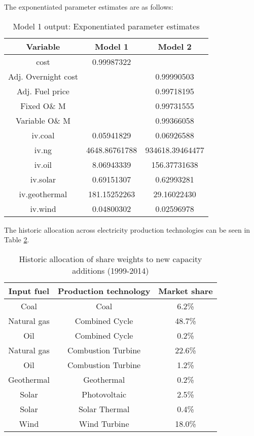\documentclass[10pt]{amsart}
\begin{document}
The exponentiated parameter estimates are as follows:
\begin{table}[H]
\caption{Model 1 output: Exponentiated parameter estimates}
\centering
\begin{tabular}{c c c}
\hline
\hline
Variable & Model 1 & Model 2 \\ [0.5ex]
\hline
cost & 0.99987322 & \\
Adj. Overnight cost & & 0.99990503 \\
Adj. Fuel price & & 0.99718195\\
Fixed O\& M & & 0.99731555\\
Variable O\& M & & 0.99366058\\
iv.coal & 0.05941829 & 0.06926588\\
iv.ng & 4648.86761788 & 934618.39464477\\
iv.oil & 8.06943339 & 156.37731638 \\
iv.solar & 0.69151307 & 0.62993281\\
iv.geothermal & 181.15252263 & 29.16022430\\
iv.wind & 0.04800302 & 0.02596978\\ [1ex]
\hline
\end{tabular}
\label{table:nl.1}
\end{table}

The historic allocation across electricity production technologies can be seen in Table \ref{table:perc}.

\begin{table}[H]
\caption{Historic allocation of share weights to new capacity additions (1999-2014)}
\centering
\begin{tabular}{c c c}
\hline
\hline
Input fuel & Production technology & Market share \\ [0.5ex]
\hline
Coal & Coal & 6.2\% \\
Natural gas & Combined Cycle & 48.7\% \\
Oil & Combined Cycle & 0.2\% \\
Natural gas & Combustion Turbine & 22.6\% \\
Oil & Combustion Turbine & 1.2\% \\
Geothermal & Geothermal & 0.2\% \\
Solar & Photovoltaic & 2.5\% \\
Solar & Solar Thermal & 0.4\% \\
Wind & Wind Turbine & 18.0\% \\ [1ex]
\hline
\end{tabular}
\label{table:perc}
\end{table}
\end{document}
